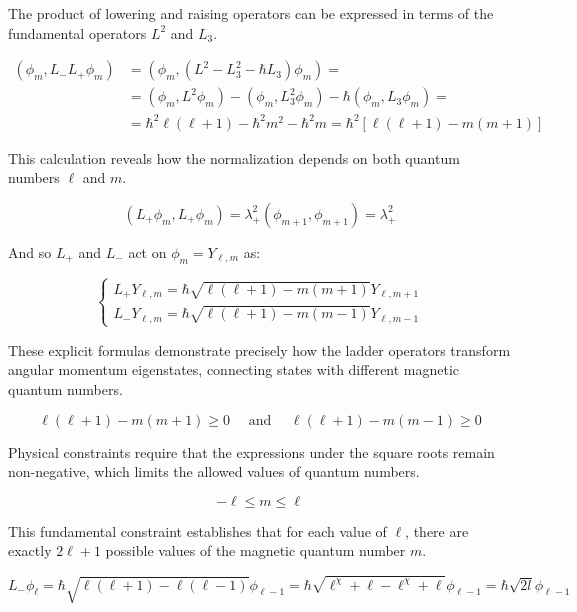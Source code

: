 \documentclass[italian]{HKNdocument}
\begin{document}
The product of lowering and raising operators can be expressed in terms of the fundamental operators $L^2$ and $L_3$.

\begin{align}
\left(\phi_{m}, L_{-} L_{+} \phi_{m}\right) & =\left(\phi_{m},\left(L^{2}-L_{3}^{2}-\hbar L_{3}\right) \phi_{m}\right)= \\
& =\left(\phi_{m}, L^{2} \phi_{m}\right)-\left(\phi_{m}, L_{3}^{2} \phi_{m}\right)-\hbar\left(\phi_{m}, L_{3} \phi_{m}\right)=  \\
& =\hbar^{2} \ell(\ell+1)-\hbar^{2} m^{2}-\hbar^{2} m=\hbar^{2}[\ell(\ell+1)-m(m+1)]
\end{align}

This calculation reveals how the normalization depends on both quantum numbers $\ell$ and $m$.

\begin{equation}
\left(L_{+} \phi_{m}, L_{+} \phi_{m}\right)=\lambda_{+}^{2}\left(\phi_{m+1}, \phi_{m+1}\right)=\lambda_{+}^{2}
\end{equation}

And so $L_{+}$ and $L_{-}$ act on $\phi_{m}=Y_{\ell, m}$ as:

\[
\left\{\begin{array}{l}
L_{+} Y_{\ell, m}=\hbar \sqrt{\ell(\ell+1)-m(m+1)} Y_{\ell, m+1}  \\
L_{-} Y_{\ell, m}=\hbar \sqrt{\ell(\ell+1)-m(m-1)} Y_{\ell, m-1}
\end{array}\right.
\]

These explicit formulas demonstrate precisely how the ladder operators transform angular momentum eigenstates, connecting states with different magnetic quantum numbers.

\begin{equation}
\ell(\ell+1)-m(m+1) \geq 0 \quad \text { and } \quad \ell(\ell+1)-m(m-1) \geq 0
\end{equation}

Physical constraints require that the expressions under the square roots remain non-negative, which limits the allowed values of quantum numbers.

\begin{equation}
-\ell \leq m \leq \ell
\end{equation}

This fundamental constraint establishes that for each value of $\ell$, there are exactly $2\ell+1$ possible values of the magnetic quantum number $m$.

\begin{equation}
L_{-} \phi_{\ell}=\hbar \sqrt{\ell(\ell+1)-\ell(\ell-1)} \phi_{\ell-1}=\hbar \sqrt{\ell^{\chi}+\ell-\ell^{\chi}+\ell} \phi_{\ell-1}=\hbar \sqrt{2 l} \phi_{\ell-1}
\end{equation}
\end{document}
